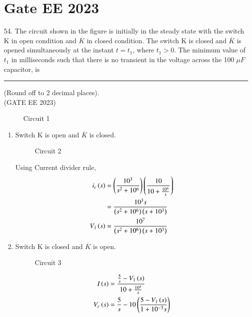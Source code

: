 \documentclass[journal,12pt,twocolumn]{IEEEtran}
\begin{document}


\vspace{3cm}

\title{}
\author{EE23BTECH11054 -  Sai Krishna Shanigarapu$^{*}$
}
\maketitle
\newpage
\bigskip


\section*{Gate EE 2023}
54. \hspace{2pt}The circuit shown in the figure is initially in the steady state with the switch K in open condition and $\overline{K}$ in closed condition. The switch K is closed and $\overline{K}$ is opened simultaneously at the instant $t = t_1$, where $t_1 > 0$. The minimum value of $t_1$ in milliseconds such that there is no transient in the voltage across the 100 $\mu F$ capacitor, is \rule{1cm}{0.15mm} (Round off to 2 decimal places).\\ \hfill(GATE EE 2023)

\begin{figure}[ht]
  \centering
  \resizebox{0.8\columnwidth}{!}{}
  \caption{Circuit 1}
\end{figure}

\solution
\begin{enumerate}
\item Switch K is open and $\overline{K}$ is closed.
\begin{figure}[ht]
  \centering
  \resizebox{0.50\columnwidth}{!}{}
  \caption{Circuit 2}
\end{figure}

Using Current divider rule,
\begin{align}
    i_c\left(s\right) &= \left(\frac{10^3}{s^2 + 10^6}\right)\left(\frac{10}{10 + \frac{10^4}{s}}\right)\\
    &= \frac{10^3 s}{\left(s^2 + 10^6\right)\left(s + 10^3\right)}\\
    V_1\left(s\right) &= \frac{10^7}{\left(s^2 + 10^6\right) \left(s + 10^3\right)} 
\end{align}


\item Switch K is closed and $\overline{K}$ is open.

\begin{figure}[ht]
  \centering
  \resizebox{0.55\columnwidth}{!}{}
  \caption{Circuit 3}
\end{figure}



\begin{align}
    I\left(s\right) &= \frac{\frac{5}{s} - V_1\left(s\right)}{10 + \frac{10^4}{s}}\\
    V_c\left(s\right) &= \frac{5}{s} - 10\left(\frac{5-V_1\left(s\right)}{1+10^{-3}s}\right)
\end{align}
\end{enumerate}
\end{document}
